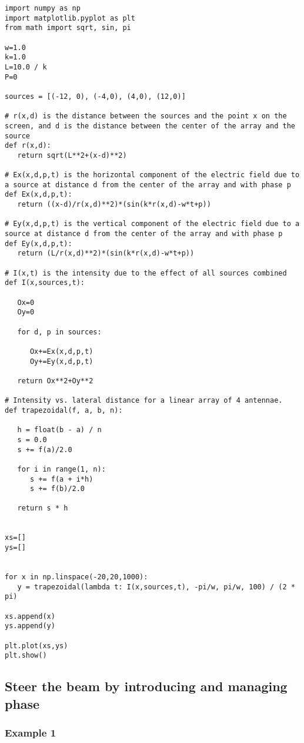 \begin{Verbatim}[fontsize=\small,baselinestretch=0.9]
import numpy as np
import matplotlib.pyplot as plt
from math import sqrt, sin, pi

w=1.0
k=1.0
L=10.0 / k
P=0

sources = [(-12, 0), (-4,0), (4,0), (12,0)]

# r(x,d) is the distance between the sources and the point x on the screen, and d is the distance between the center of the array and the source
def r(x,d):
   return sqrt(L**2+(x-d)**2)

# Ex(x,d,p,t) is the horizontal component of the electric field due to a source at distance d from the center of the array and with phase p
def Ex(x,d,p,t):
   return ((x-d)/r(x,d)**2)*(sin(k*r(x,d)-w*t+p))

# Ey(x,d,p,t) is the vertical component of the electric field due to a source at distance d from the center of the array and with phase p
def Ey(x,d,p,t):
   return (L/r(x,d)**2)*(sin(k*r(x,d)-w*t+p))

# I(x,t) is the intensity due to the effect of all sources combined
def I(x,sources,t):

   Ox=0
   Oy=0

   for d, p in sources:

      Ox+=Ex(x,d,p,t)
      Oy+=Ey(x,d,p,t)

   return Ox**2+Oy**2

# Intensity vs. lateral distance for a linear array of 4 antennae.
def trapezoidal(f, a, b, n):

   h = float(b - a) / n
   s = 0.0
   s += f(a)/2.0

   for i in range(1, n):
      s += f(a + i*h)
      s += f(b)/2.0

   return s * h


xs=[]
ys=[]


for x in np.linspace(-20,20,1000):
   y = trapezoidal(lambda t: I(x,sources,t), -pi/w, pi/w, 100) / (2 * pi)

xs.append(x)
ys.append(y)

plt.plot(xs,ys)
plt.show()   
\end{Verbatim}

\subsection{Steer the beam by introducing and managing phase}

\subsubsection{Example 1}\label{code:phase_right}

